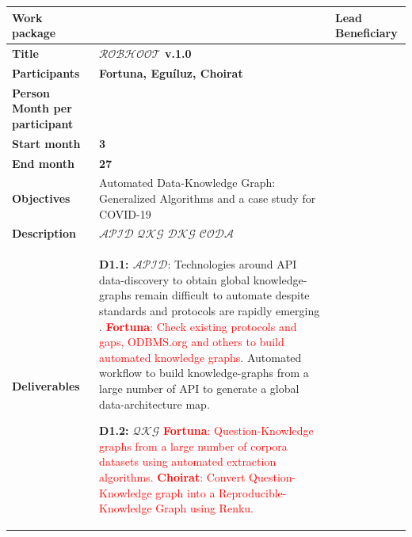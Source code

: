 \documentclass[11pt, a4paper]{article} %
\begin{document}
\begin{table}[h!]
\begin{center}
  \begin{tabular}{|m{3cm} || m{12cm} || m{1cm}|}
    \hline\hline
    \rowcolor{lightpink!30}
    {\bf Work package} & & {\bf Lead Beneficiary} \\
    \hline\hline
    \rowcolor{piggypink!20}
    {\bf Title} & {\bf $\mathcal{ROBHOOT}$ v.1.0} &  \\
    \hline\hline
    \rowcolor{piggypink!20}
    {\bf Participants} & {\bf Fortuna, Egu\'iluz, Choirat} & \\
    \hline\hline
    \rowcolor{piggypink!20}
    {\bf Person Month per participant} & & \\
    \hline\hline
    \rowcolor{piggypink!20}
    {\bf Start month} & {\bf 3} & \\
    \hline\hline
    \rowcolor{piggypink!40}
    {\bf End month} & {\bf 27} & \\
    \hline\hline
    \rowcolor{piggypink!40}
    {\bf Objectives} & Automated Data-Knowledge Graph: Generalized Algorithms and a case study for COVID-19 & \\
    \hline\hline
    \rowcolor{piggypink!40}
    {\bf Description} & $\mathcal{APID}$ $\mathcal{QKG}$ $\mathcal{DKG}$ $\mathcal{CODA}$ & \\
    \hline\hline
    \rowcolor{piggypink!40}
    {\bf Deliverables} & {\bf D1.1: $\mathcal{APID}$}: Technologies around API data-discovery to
                         obtain global knowledge-graphs remain difficult to automate despite
                         standards and protocols are rapidly emerging
                         \citep{Fan2012,APISGURU,OpenKnowledgeFoundation}.
                         \textcolor{red}{{\bf Fortuna}: Check existing protocols and gaps,
                         ODBMS.org and others to build automated knowledge graphs}. Automated workflow to build
                         knowledge-graphs from a large number of API to
                         generate a global data-architecture map.
                         
                         {\bf D1.2: $\mathcal{QKG}$} \textcolor{red}{{\bf Fortuna}:
                         Question-Knowledge graphs from a large number of corpora datasets
                         using automated extraction algorithms. {\bf Choirat}: Convert Question-Knowledge graph into a
                         Reproducible-Knowledge Graph using Renku.}
    

\end{tabular}
\end{center}
\end{table}
\end{document}
